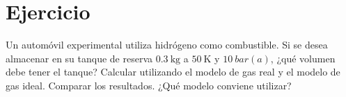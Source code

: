 \section{Ejercicio}\label{ej:Chap03Ejercicio05}
Un automóvil experimental utiliza hidrógeno como combustible. Si se desea almacenar en su tanque de reserva $\SI{0.3}{\kg}$ a $\SI{50}{\K}$ y $\SI{10}{bar(a)}$, ¿qué volumen debe tener el tanque? Calcular utilizando el modelo de gas real y el modelo de gas ideal. Comparar los resultados. ¿Qué modelo conviene utilizar?